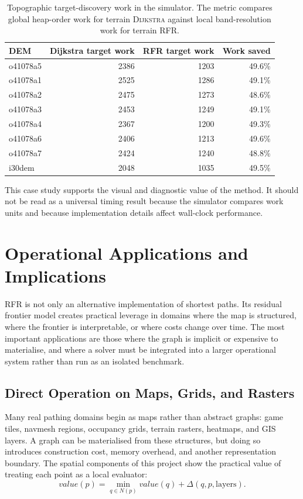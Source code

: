 \documentclass[11pt]{article}
\newcommand{\RFR}{\textsc{RFR}}
\newcommand{\Dijkstra}{\textsc{Dijkstra}}
\begin{document}
\begin{table}[htbp]
\centering
\begin{tabular}{lrrr}
\toprule
DEM & Dijkstra target work & RFR target work & Work saved \\
\midrule
o41078a5 & 2386 & 1203 & 49.6\% \\
o41078a1 & 2525 & 1286 & 49.1\% \\
o41078a2 & 2475 & 1273 & 48.6\% \\
o41078a3 & 2453 & 1249 & 49.1\% \\
o41078a4 & 2367 & 1200 & 49.3\% \\
o41078a6 & 2406 & 1213 & 49.6\% \\
o41078a7 & 2424 & 1240 & 48.8\% \\
i30dem & 2048 & 1035 & 49.5\% \\
\bottomrule
\end{tabular}
\caption{Topographic target-discovery work in the simulator. The metric compares global heap-order work for terrain \Dijkstra{} against local band-resolution work for terrain \RFR{}.}
\label{tab:topographic}
\end{table}

This case study supports the visual and diagnostic value of the method. It should not be read as a universal timing result because the simulator compares work units and because implementation details affect wall-clock performance.

\section{Operational Applications and Implications}
\label{sec:applications}

\RFR{} is not only an alternative implementation of shortest paths. Its residual frontier model creates practical leverage in domains where the map is structured, where the frontier is interpretable, or where costs change over time. The most important applications are those where the graph is implicit or expensive to materialise, and where a solver must be integrated into a larger operational system rather than run as an isolated benchmark.

\subsection{Direct Operation on Maps, Grids, and Rasters}

Many real pathing domains begin as maps rather than abstract graphs: game tiles, navmesh regions, occupancy grids, terrain rasters, heatmaps, and GIS layers. A graph can be materialised from these structures, but doing so introduces construction cost, memory overhead, and another representation boundary. The spatial components of this project show the practical value of treating each point as a local evaluator:
\[
  value(p)=\min_{q\in N(p)} value(q)+\Delta(q,p,\text{layers}).
\]
\end{document}
